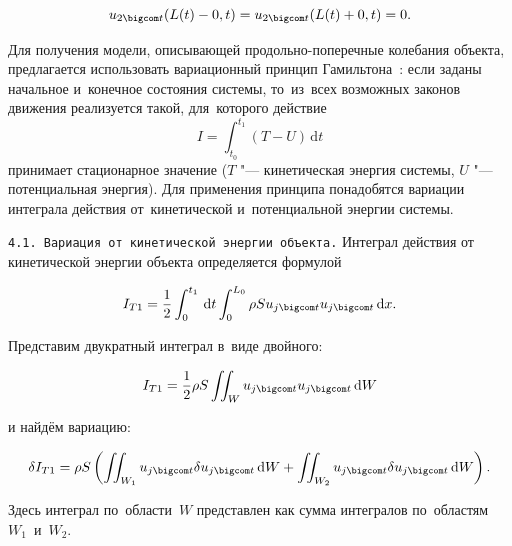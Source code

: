 \begin{equation}\label{Anisimov_eq7}

u_{2 \bigcom t}(L(t)-0, t)=u_{2 \bigcom t}(L(t)+0, t)=0.

\end{equation}





\smallskip



 Для получения модели, описывающей продольно-поперечные колебания объекта, предлагается использовать вариационный принцип Гамильтона~\cite{Anisimov_bib17}: если заданы начальное и~конечное состояния системы, то~из~всех возможных законов движения реализуется такой, для~которого действие $$I=\int_{t_0}^{t_1}\left(T-U\right)\,\mathrm{d}t$$ принимает стационарное значение ($T$ "---  кинетическая энергия системы, $U$ "---  потенциальная энергия). Для применения принципа понадобятся вариации интеграла действия от~кинетической и~потенциальной энергии системы.



\smallskip



{\tt 4.1. Вариация от~кинетической энергии объекта.}  Интеграл действия от кинетической энергии объекта определяется формулой 

$$I_{T1}=\frac12\int_0^{t_1}\,\mathrm{d}t\int_0^{L_0}\rho Su_{j \bigcom t}u_{j \bigcom t}\,\mathrm{d}x.$$ 

Представим двукратный интеграл в~виде двойного:

\begin{equation}\nonumber

I_{T1}=\frac12\rho S\iint_Wu_{j \bigcom t}u_{j \bigcom t}\,\mathrm{d}W

\end{equation}

и найдём вариацию:

\begin{equation}\label{Anisimov_eq9}

\delta I_{T1}=\rho S\left(\iint_{W_1}u_{j \bigcom t}\delta u_{j \bigcom t}\,\mathrm{d}W+ \iint_{W_2}u_{j \bigcom t}\delta u_{j \bigcom t}\,\mathrm{d}W\right).

\end{equation}

Здесь интеграл по~области~$W$ представлен как сумма интегралов по~областям~$W_1$~и~$W_2$.



